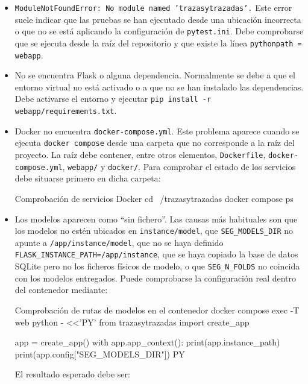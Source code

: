 \begin{itemize}
	\item \texttt{ModuleNotFoundError: No module named 'trazasytrazadas'.} Este error suele indicar que las pruebas se han ejecutado desde una ubicación incorrecta o que no se está aplicando la configuración de \texttt{pytest.ini}. Debe comprobarse que se ejecuta desde la raíz del repositorio y que existe la línea \texttt{pythonpath = webapp}.
	
	\item No se encuentra Flask o alguna dependencia. Normalmente se debe a que el entorno virtual no está activado o a que no se han instalado las dependencias. Debe activarse el entorno y ejecutar \texttt{pip install -r webapp/requirements.txt}.
	
	\item Docker no encuentra \texttt{docker-compose.yml}. Este problema aparece cuando se ejecuta \texttt{docker compose} desde una carpeta que no corresponde a la raíz del proyecto. La raíz debe contener, entre otros elementos, \texttt{Dockerfile}, \texttt{docker-compose.yml}, \texttt{webapp/} y \texttt{docker/}. Para comprobar el estado de los servicios debe situarse primero en dicha carpeta:
	
	\begin{dockerboxnf}{Comprobación de servicios Docker}
cd ~/trazasytrazadas
docker compose ps
	\end{dockerboxnf}
	
	\item Los modelos aparecen como ``sin fichero''. Las causas más habituales son que los modelos no estén ubicados en \texttt{instance/model}, que \texttt{SEG\_MODELS\_DIR} no apunte a \texttt{/app/instance/model}, que no se haya definido \texttt{FLASK\_INSTANCE\_PATH=/app/instance}, que se haya copiado la base de datos SQLite pero no los ficheros físicos de modelo, o que \texttt{SEG\_N\_FOLDS} no coincida con los modelos entregados. Puede comprobarse la configuración real dentro del contenedor mediante:
	
	\begin{dockerboxnf}{Comprobación de rutas de modelos en el contenedor}
docker compose exec -T web python - <<'PY'
from trazasytrazadas import create_app

app = create_app()
with app.app_context():
print(app.instance_path)
print(app.config["SEG_MODELS_DIR"])
PY
	\end{dockerboxnf}
	
	El resultado esperado debe ser:
	

\end{itemize}
